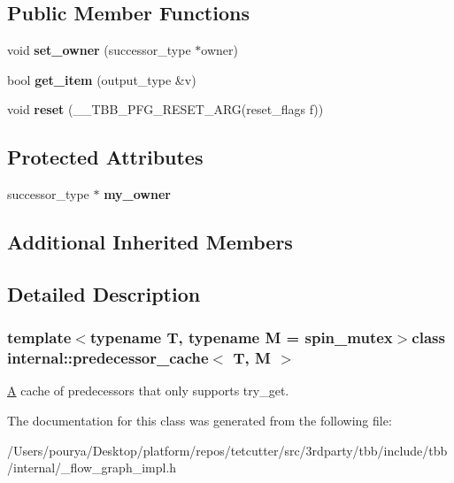 \subsection*{Public Member Functions}
\begin{DoxyCompactItemize}
\item 
\hypertarget{classinternal_1_1predecessor__cache_ae5178fd7e909b2f4466fed7d0e267dbb}{}void {\bfseries set\+\_\+owner} (successor\+\_\+type $\ast$owner)\label{classinternal_1_1predecessor__cache_ae5178fd7e909b2f4466fed7d0e267dbb}

\item 
\hypertarget{classinternal_1_1predecessor__cache_a5e55ce0bcbb697c63fd211364ad306d1}{}bool {\bfseries get\+\_\+item} (output\+\_\+type \&v)\label{classinternal_1_1predecessor__cache_a5e55ce0bcbb697c63fd211364ad306d1}

\item 
\hypertarget{classinternal_1_1predecessor__cache_a71810a16953585ee9246a28e7f2b5e7c}{}void {\bfseries reset} (\+\_\+\+\_\+\+T\+B\+B\+\_\+\+P\+F\+G\+\_\+\+R\+E\+S\+E\+T\+\_\+\+A\+R\+G(reset\+\_\+flags f))\label{classinternal_1_1predecessor__cache_a71810a16953585ee9246a28e7f2b5e7c}

\end{DoxyCompactItemize}
\subsection*{Protected Attributes}
\begin{DoxyCompactItemize}
\item 
\hypertarget{classinternal_1_1predecessor__cache_ac5c21dea1ad5499bb5877b5a5a06247d}{}successor\+\_\+type $\ast$ {\bfseries my\+\_\+owner}\label{classinternal_1_1predecessor__cache_ac5c21dea1ad5499bb5877b5a5a06247d}

\end{DoxyCompactItemize}
\subsection*{Additional Inherited Members}


\subsection{Detailed Description}
\subsubsection*{template$<$typename T, typename M = spin\+\_\+mutex$>$class internal\+::predecessor\+\_\+cache$<$ T, M $>$}

\hyperlink{structA}{A} cache of predecessors that only supports try\+\_\+get. 

The documentation for this class was generated from the following file\+:\begin{DoxyCompactItemize}
\item 
/\+Users/pourya/\+Desktop/platform/repos/tetcutter/src/3rdparty/tbb/include/tbb/internal/\+\_\+flow\+\_\+graph\+\_\+impl.\+h\end{DoxyCompactItemize}
